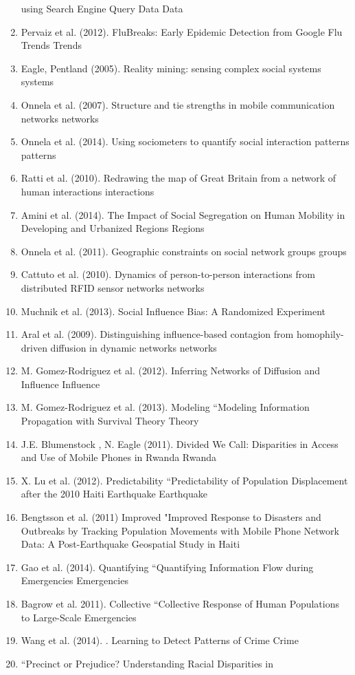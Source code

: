\begin{enumerate}
using Search Engine Query Data\cite{Ginsberg_2008} Data  \item Pervaiz et al. (2012).  FluBreaks: Early Epidemic Detection from Google Flu Trends\cite{Pervaiz_2012} Trends  \item Eagle, Pentland (2005).  Reality mining: sensing complex social systems\cite{Eagle_2005} systems  \item Onnela et al. (2007).  Structure and tie strengths in mobile communication networks\cite{Onnela_2007} networks  \item Onnela et al. (2014).  Using sociometers to quantify social interaction patterns\cite{Onnela_2014} patterns  \item Ratti et al. (2010).  Redrawing the map of Great Britain from a network of human interactions\cite{Ratti_2010} interactions  \item Amini et al. (2014).  The Impact of Social Segregation on Human Mobility in Developing and Urbanized Regions\cite{Amini_2014} Regions  \item Onnela et al. (2011).  Geographic constraints on social network groups\cite{Onnela_2011} groups  \item Cattuto et al. (2010).  Dynamics of person-to-person interactions from distributed RFID sensor networks\cite{Cattuto_2010} networks  \item Muchnik et al. (2013).  Social Influence Bias: A Randomized Experiment\cite{Muchnik_2013}  \item Aral et al. (2009).  Distinguishing influence-based contagion from homophily-driven diffusion in dynamic networks\cite{Aral_2009} networks  \item M. Gomez-Rodriguez et al. (2012).  Inferring Networks of Diffusion and Influence\cite{Gomez_Rodriguez_2012} Influence  \item  M. Gomez-Rodriguez et al. (2013). Modeling “Modeling  Information Propagation with Survival Theory\cite{rodriguez2013modeling} Theory  \item J.E. Blumenstock , N. Eagle (2011).  Divided We Call: Disparities in Access and Use of Mobile Phones in Rwanda\cite{blumenstock2012divided} Rwanda  \item  X. Lu et al. (2012). Predictability “Predictability  of Population Displacement after the 2010 Haiti Earthquake\cite{Lu_2012} Earthquake  \item  Bengtsson et al. (2011) Improved "Improved  Response to Disasters and Outbreaks by Tracking Population Movements with Mobile Phone Network Data: A Post-Earthquake Geospatial Study in Haiti\cite{Bengtsson_2011}  \item  Gao et al. (2014). Quantifying “Quantifying  Information Flow during Emergencies\cite{Gao_2014} Emergencies  \item  Bagrow et al. 2011). Collective “Collective  Response of Human Populations to Large-Scale Emergencies\cite{Bagrow_2011}  \item  Wang et al. (2014). .  Learning to Detect Patterns of Crime\cite{Wang_2013} Crime  \item  “Precinct or Prejudice? Understanding Racial Disparities in 
\end{enumerate}
